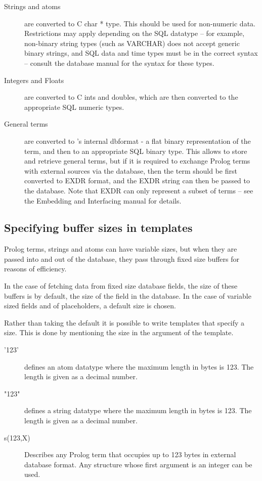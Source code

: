 \begin{description}
\item[Strings and atoms] are converted to C char * type. This should be used for 
  non-numeric data. Restrictions may apply depending on the SQL datatype --
  for example, non-binary string types (such as VARCHAR) does not accept
  generic binary strings, and SQL data and time types must be in the
  correct syntax -- consult the database manual for the syntax for these types.
\item[Integers and Floats] are converted to C ints and doubles, which are
  then converted to the appropriate SQL numeric types.
\item[General terms] are converted to {\eclipse}'s internal dbformat
 - a flat binary representation of the term, and then to an appropriate SQL
 binary type. This 
 allows {\eclipse\/} to store and retrieve general terms, but if it is
 required to exchange Prolog terms with external sources via the
 database, then the term should be first converted to EXDR format, and the
 EXDR string can then be passed to the database. Note that EXDR can only
 represent a subset of terms -- see the Embedding and Interfacing manual
 for details.

\end{description}


\subsection{Specifying buffer sizes in templates}
Prolog terms, strings and atoms can have variable sizes, but when they are
passed into and out of the database, they pass through fixed size buffers
for reasons of efficiency.

In the case of fetching data from fixed size database fields, the size of
these buffers is by default, the size of the field in the database.
In the case of variable sized fields and of placeholders, a default size
is chosen.

Rather than taking the default it is possible to write templates that
specify a size. This is done by mentioning the size in the argument of
the template.

\begin{description}
\item['123'] defines an atom datatype where the maximum length in
bytes is 123. The length is given as a decimal number.

\item["123"] defines a string datatype where the maximum length in
bytes is 123. The length is given as a decimal number.

\item[s(123,X)] Describes any Prolog term that occupies up to 123 bytes
in external database format. Any structure whose first argument is an integer
can be used.
\end{description}

